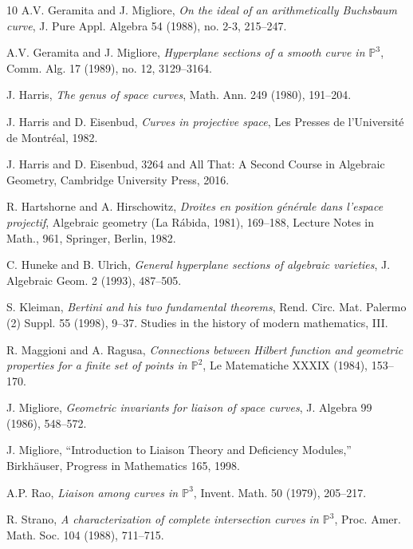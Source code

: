 \documentclass[12pt]{amsart}%
\numberwithin{equation}{section}
\theoremstyle{definition}
\numberwithin{equation}{section}
\newcommand{\PP}{ \ensuremath{\mathbb{P}}}
\begin{document}
\begin{thebibliography}{10}
 A.V. Geramita and J. Migliore, {\it On the ideal of an arithmetically Buchsbaum curve}, J. Pure Appl. Algebra 54 (1988), no. 2-3, 215–247.

 A.V. Geramita and J. Migliore, {\it Hyperplane sections of a smooth curve in $\mathbb P^3$}, Comm. Alg. 17 (1989), no. 12, 3129--3164.

J. Harris, {\it The genus of space
  curves}, Math. Ann. 249 (1980), 191--204.

 J. Harris and D. Eisenbud, {\it Curves in projective space}, Les Presses de l’Université de Montréal, 1982.
 
 J. Harris and D. Eisenbud, {3264 and All That: A Second Course in Algebraic Geometry}, Cambridge University Press, 2016.

 R. Hartshorne and A. Hirschowitz,  {\it Droites en position g\'en\'erale dans l'espace projectif}, Algebraic geometry (La R\'abida, 1981), 169--188, Lecture Notes in Math., 961, Springer, Berlin, 1982. 

  C. Huneke and B. Ulrich, {\it General hyperplane sections of algebraic varieties}, J. Algebraic Geom. 2 (1993), 487--505.

 S. Kleiman, {\it Bertini and his two fundamental theorems}, Rend. Circ. Mat. Palermo (2)
Suppl. 55 (1998), 9--37. Studies in the history of modern mathematics, III. 

  R. Maggioni and A. Ragusa, {\it Connections between Hilbert function and geometric properties for a finite set of points in $\mathbb P^2$}, Le Matematiche XXXIX (1984), 153--170.

J. Migliore, {\it Geometric invariants for liaison of space curves}, J. Algebra 99 (1986), 548--572.

 J. Migliore, ``Introduction to Liaison Theory and Deficiency Modules,''
Birkh\"auser, Progress in Mathematics 165, 1998.

A.P. Rao, {\it Liaison among curves in $\PP^3$}, Invent. Math. 50 (1979), 205--217.

 R. Strano, {\it A characterization of complete intersection curves in $\mathbb P^3$}, Proc. Amer. Math. Soc. 104 (1988), 711--715.

\end{thebibliography}
\end{document}
